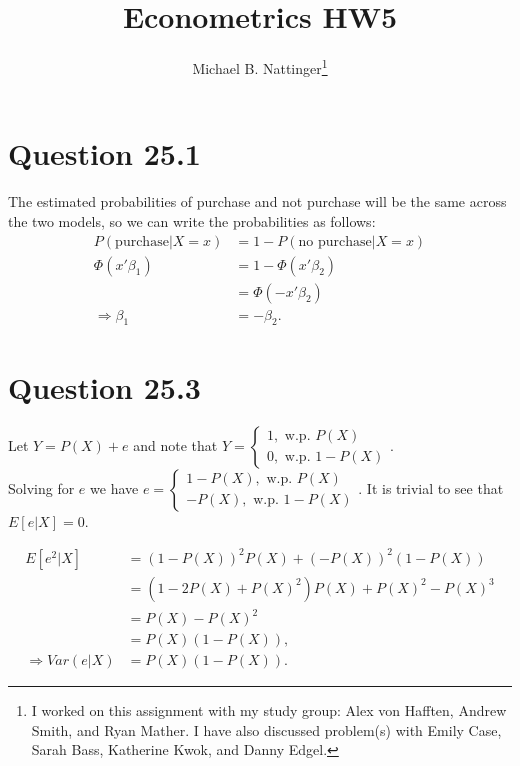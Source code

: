 \documentclass[11pt]{article} %
\title{Econometrics HW5}
\author{Michael B. Nattinger\footnote{I worked on this assignment with my study group: Alex von Hafften, Andrew Smith, and Ryan Mather. I have also discussed problem(s) with Emily Case, Sarah Bass, Katherine Kwok, and Danny Edgel.}}
\begin{document}
\maketitle

\section{Question 25.1}
The estimated probabilities of purchase and not purchase will be the same across the two models, so we can write the probabilities as follows:
\begin{align*}
P(\text{purchase}|X=x) &= 1-P(\text{no purchase}|X=x)\\
\Phi(x'\beta_1) &= 1-\Phi(x'\beta_2)\\
&= \Phi(-x'\beta_2)\\
\Rightarrow \beta_1 &= -\beta_2.
\end{align*}
\section{Question 25.3}
Let $Y = P(X) + e$ and note that $Y = \begin{cases} 1, \text{ w.p. } P(X) \\ 0, \text{ w.p. } 1-P(X)\end{cases}$.\\ Solving for $e$ we have $e = \begin{cases} 1-P(X), \text{ w.p. } P(X) \\ -P(X), \text{ w.p. } 1-P(X)\end{cases}$. It is trivial to see that $E[e|X] = 0$.

\begin{align*}
E[e^2|X] &= (1-P(X))^2P(X) + (-P(X))^2(1-P(X)) \\
&= (1-2P(X) + P(X)^2)P(X) + P(X)^2 - P(X)^3\\
&= P(X) - P(X)^2\\
&= P(X)(1-P(X)),\\
\Rightarrow Var(e|X) &= P(X)(1-P(X)).
\end{align*}
\end{document}
